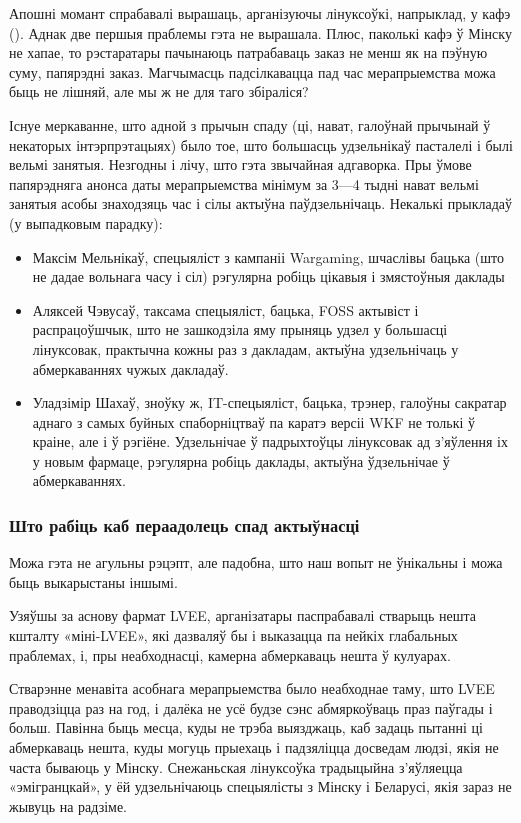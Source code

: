 \documentclass[10pt, a5paper]{article}
\begin{document}
Апошні момант спрабавалі вырашаць, арганізуючы лінуксоўкі, напрыклад, у кафэ (\cite{zack1}). Аднак две першыя праблемы гэта не вырашала. Плюс, паколькі кафэ ў Мінску не хапае, то рэстаратары пачынаюць патрабаваць заказ не менш як на пэўную суму, папярэдні заказ. Магчымасць падсілкавацца пад час мерапрыемства можа быць не лішняй, але мы ж не для таго збіраліся?

Існуе меркаванне, што адной з прычын спаду (ці, нават, галоўнай прычынай ў некаторых інтэрпрэтацыях) было тое, што большасць удзельнікаў пасталелі і былі вельмі занятыя. Незгодны і лічу, што гэта звычайная адгаворка. Пры ўмове папярэдняга анонса даты мерапрыемства мінімум за 3—4 тыдні нават вельмі занятыя асобы знаходзяць час і сілы актыўна паўдзельнічаць. Некалькі прыкладаў (у выпадковым парадку):

\begin{itemize}
  \item {Максім Мельнікаў}, спецыяліст з кампаніі Wargaming, шчаслівы бацька (што не дадае вольнага часу і сіл) рэгулярна робіць цікавыя і змястоўныя даклады
  \item {Аляксей Чэвусаў}, таксама спецыяліст, бацька, FOSS актывіст і распрацоўшчык, што не зашкодзіла яму прыняць удзел у большасці лінуксовак, практычна кожны раз з дакладам, актыўна удзельнічаць у абмеркаваннях чужых дакладаў.
  \item {Уладзімір Шахаў}, зноўку ж, IT-спецыяліст, бацька, трэнер, галоўны сакратар аднаго з самых буйных спаборніцтваў па каратэ версіі WKF не толькі ў краіне, але і ў рэгіёне. Удзельнічае ў падрыхтоўцы лінуксовак ад з'яўлення іх у новым фармаце, рэгулярна робіць даклады, актыўна ўдзельнічае ў абмеркаваннях.
\end{itemize}

\subsubsection*{Што рабіць каб пераадолець спад актыўнасці}

Можа гэта не агульны рэцэпт, але падобна, што наш вопыт не ўнікальны і можа быць выкарыстаны іншымі.

Узяўшы за аснову фармат LVEE, арганізатары паспрабавалі стварыць нешта кшталту «міні-LVEE», які дазваляў бы і выказацца па нейкіх глабальных праблемах, і, пры неабходнасці, камерна абмеркаваць нешта ў кулуарах.

Стварэнне менавіта асобнага мерапрыемства было неабходнае таму, што LVEE праводзіцца раз на год, і далёка не усё будзе сэнс абмяркоўваць праз паўгады і больш. Павінна быць месца, куды не трэба выязджаць, каб задаць пытанні ці абмеркаваць нешта, куды могуць прыехаць і падзяліцца досведам людзі, якія не часта бываюць у Мінску. Снежаньская лінуксоўка традыцыйна з'яўляецца «эмігранцкай», у ёй удзельнічаюць спецыялісты з Мінску і Беларусі, якія зараз не жывуць на радзіме.
\end{document}
